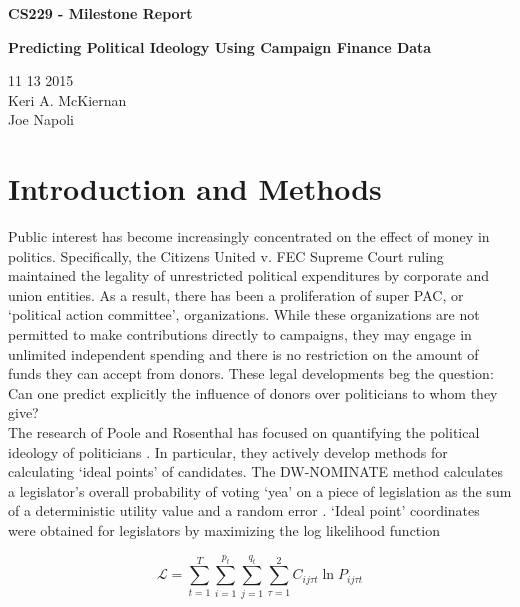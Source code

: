 \documentclass[10]{article}
\begin{document}
\begin{center}
\huge{\textbf{CS229 - Milestone Report}} \\
\end{center}
\begin{center}
\huge{\textbf{Predicting Political Ideology Using Campaign Finance Data}} \\
\end{center}
\begin{center}
\normalsize{11 13 2015} \\

Keri A. McKiernan \\
Joe Napoli
\end{center}
\section*{Introduction and Methods}
Public interest has become increasingly concentrated on the effect of money in politics. Specifically, the Citizens United v. FEC Supreme Court ruling maintained the legality of unrestricted political expenditures by corporate and union entities. As a result, there has been a proliferation of super PAC, or `political action committee',  organizations. While these organizations are not permitted to make contributions directly to campaigns, they may engage in unlimited independent spending and there is no restriction on the amount of funds they can accept from donors. These legal developments beg the question: Can one predict explicitly the influence of donors over politicians to whom they give? \\

The research of Poole and Rosenthal has focused on quantifying the political ideology of politicians \cite{PR}. In particular, they actively develop methods for calculating `ideal points' of candidates. The DW-NOMINATE method calculates a legislator’s overall probability of voting `yea' on a piece of legislation as the sum of a deterministic utility value and a random error \cite{NOMBOOT}. `Ideal point' coordinates were obtained for legislators by maximizing the log likelihood function

\[ \mathcal{L} = \sum_{t=1}^{T} \sum_{i=1}^{p_t} \sum_{j=1}^{q_t} \sum_{\tau = 1}^{2} C_{ij \tau t} \ln P_{ij \tau t} \]
\end{document}
